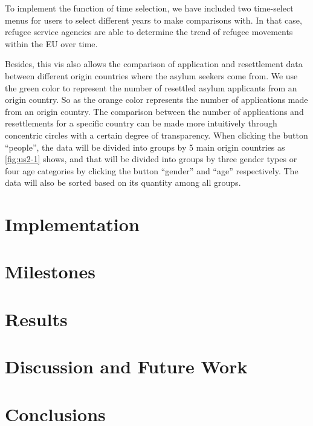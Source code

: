 \documentclass[journal]{vgtc}                %
\begin{document}
To implement the function of time selection, we have included two time-select menus for users to select different years to make comparisons with. In that case, refugee service agencies are able to determine the trend of refugee movements within the EU over time. 

Besides, this vis also allows the comparison of application and resettlement data between different origin countries where the asylum seekers come from. We use the green color to represent the number of resettled asylum applicants from an origin country. So as the orange color represents the number of applications made from an origin country. The comparison between the number of applications and resettlements for a specific country can be made more intuitively through concentric circles with a certain degree of transparency. When clicking the button “people”, the data will be divided into groups by 5 main origin countries as \autoref{fig:us2-1} shows, and that will be divided into groups by three gender types or four age categories by clicking the button “gender” and “age” respectively. The data will also be sorted based on its quantity among all groups. 


\section{Implementation}
\section{Milestones}
\section{Results}
\section{Discussion and Future Work}
\section{Conclusions}



%
%
%

%


\end{document}
